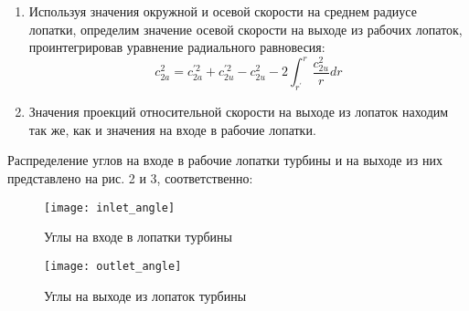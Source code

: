 \begin{enumerate}
	\item Используя значения окружной и осевой скорости на среднем радиусе лопатки, определим значение осевой скорости на выходе из рабочих лопаток, проинтегрировав уравнение радиального равновесия:
		$$
			c_{2a}^2 = c_{2a}^{\prime 2} + c_{2u}^{\prime 2} - c_{2u}^{2} - 2 \int_{r^\prime}^r \frac{c_{2u}^2}{r} dr
		$$
%

	\item Значения проекций относительной скорости на выходе из лопаток находим так же, как и значения на входе в рабочие лопатки.


\end{enumerate}

Распределение углов на входе в рабочие лопатки турбины и на выходе из них представлено на рис. 2 и 3, соответственно:
	\begin{figure}[H]
		\centering
		\texttt{[image: inlet\_angle]}
		\caption{Углы на входе в лопатки турбины}
	\end{figure}

	\begin{figure}[H]
		\centering
		\texttt{[image: outlet\_angle]}
		\caption{Углы на выходе из лопаток турбины}
	\end{figure}

